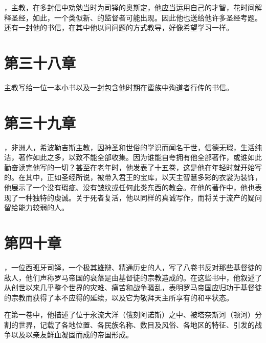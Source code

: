 ，主教，在多封信中劝勉当时为司铎的奥斯定，他应当运用自己的才智，花时间解释圣经，如此，一个类似新、的监督者可能出现。因此他也送给他许多圣经考题。还有一封他的书信，在其中他以问问题的方式教导，好像希望学习一样。\par


\section{第三十八章}

主教写给一位一本小书以及一封包含他时期在蛮族中殉道者行传的书信。\par


\section{第三十九章}

，非洲人，希波勒吉斯主教，因神圣和世俗的学识而闻名于世，信德无瑕，生活纯洁，著作如此之多，以致不能全部收集。因为谁能自夸拥有他全部著作，或谁如此勤奋读完他写的一切？甚至在老年时，他发表了十五卷，这是他在年轻时就开始写的。在其中，正如圣经所说，被带入君王的宝库，以天主智慧多彩的衣裳为装饰，他展示了一个没有瑕疵、没有皱纹或任何此类东西的教会。在他的著作中，他也表现了一种独特的虔诚。关于死者复活，他以同样的真诚写作，而将关于流产的疑问留给能力较弱的人。\par


\section{第四十章}

，一位西班牙司铎，一个极其雄辩、精通历史的人，写了八卷书反对那些基督徒的敌人，他们声称罗马帝国的衰落是由基督徒的宗教造成的。在这些书中，他叙述了从创世以来几乎整个世界的灾难、痛苦和战争骚乱，表明罗马帝国应归功于基督徒的宗教而获得了本不应得的延续，以及它为敬拜天主所享有的和平状态。\par

在第一卷中，他描述了位于永流大洋（俄刻阿诺斯）之中、被塔奈斯河（顿河）分割的世界，记载了各地位置、各民族名称、数目及风俗、各地区的特征、引发的战争以及以亲友鲜血凝固而成的帝国形成。\par

